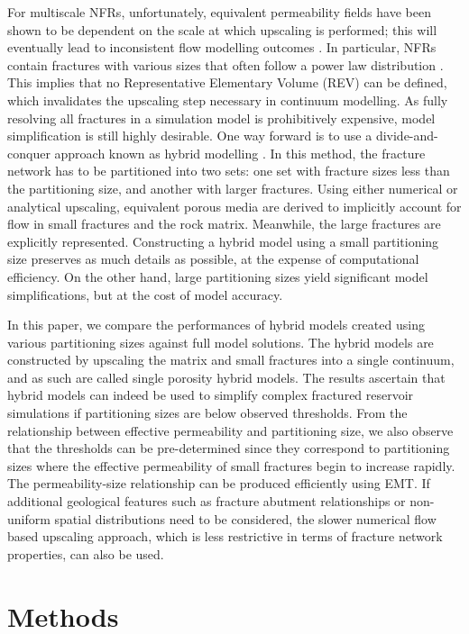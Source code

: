 \documentclass[draft]{agujournal2018}
\begin{document}
For multiscale NFRs, unfortunately, equivalent permeability fields have been shown to be dependent on the scale at which upscaling is performed; this will eventually lead to inconsistent flow modelling outcomes \citep{Azizmohammadi2017}. In particular, NFRs contain fractures with various sizes that often follow a power law distribution \citep{Bonnet2001}. This implies that no Representative Elementary Volume (REV) can be defined, which invalidates the upscaling step necessary in continuum modelling. As fully resolving all fractures in a simulation model is prohibitively expensive, model simplification is still highly desirable. One way forward is to use a divide-and-conquer approach known as hybrid modelling \citep{Berkowitz2002, Bourbiaux2010}. In this method, the fracture network has to be partitioned into two sets: one set with fracture sizes less than the partitioning size, and another with larger fractures. Using either numerical or analytical upscaling, equivalent porous media are derived to implicitly account for flow in small fractures and the rock matrix. Meanwhile, the large fractures are explicitly represented. Constructing a hybrid model using a small partitioning size preserves as much details as possible, at the expense of computational efficiency. On the other hand, large partitioning sizes yield significant model simplifications, but at the cost of model accuracy.

In this paper, we compare the performances of hybrid models created using various partitioning sizes against full model solutions. The hybrid models are constructed by upscaling the matrix and small fractures into a single continuum, and as such are called single porosity hybrid models. The results ascertain that hybrid models can indeed be used to simplify complex fractured reservoir simulations if partitioning sizes are below observed thresholds. From the relationship between effective permeability and partitioning size, we also observe that the thresholds can be pre-determined since they correspond to partitioning sizes where the effective permeability of small fractures begin to increase rapidly. The permeability-size relationship can be produced efficiently using EMT. If additional geological features such as fracture abutment relationships or non-uniform spatial distributions need to be considered, the slower numerical flow based upscaling approach, which is less restrictive in terms of fracture network properties, can also be used.

\section{Methods}
\end{document}
